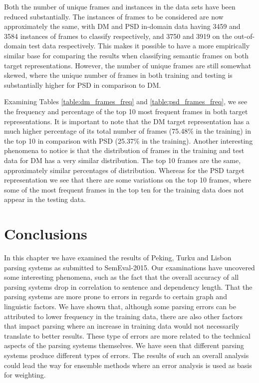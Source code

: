 Both the number of unique frames and instances in the data sets have been reduced substantially. The instances of frames to be considered are now approximately the same, with DM and PSD in-domain data having 3459 and 3584 instances of frames to classify respectively, and 3750 and 3919 on the out-of-domain test data respectively. This makes it possible to have a more empirically similar base for comparing the results when classifying semantic frames on both target representations. However, the number of unique frames are still somewhat skewed, where the unique number of frames in both training and testing is substantially higher for PSD in comparison to DM.

Examining Tables \ref{table:dm_frames_freq} and \ref{table:psd_frames_freq}, we see the frequency and percentage of the top 10 most frequent frames in both target representations. It is important to note that the DM target representation has a much higher percentage of its total number of frames (75.48\% in the training) in the top 10 in comparison with PSD (25.37\% in the training). Another interesting phenomena to notice is that the distribution of frames in the training and test data for DM has a very similar distribution. The top 10 frames are the same, approximately similar percentages of distribution. Whereas for the PSD target representation we see that there are some variations on the top 10 frames, where some of the most frequent frames in the top ten for the training data does not appear in the testing data.

\section{Conclusions}

In this chapter we have examined the results of Peking, Turku and Lisbon parsing systems as submitted to SemEval-2015. Our examinations have uncovered some interesting phenomena, such as the fact that the overall accuracy of all parsing systems drop in correlation to sentence and dependency length. That the parsing systems are more prone to errors in regards to certain graph and linguistic factors. We have shown that, although some parsing errors can be attributed to lower frequency in the training data, there are also other factors that impact parsing where an increase in training data would not necessarily translate to better results. These type of errors are more related to the technical aspects of the parsing systems themselves. We have seen that different parsing systems produce different types of errors. The results of such an overall analysis could lead the way for ensemble methods where an error analysis is used as basis for weighting.

